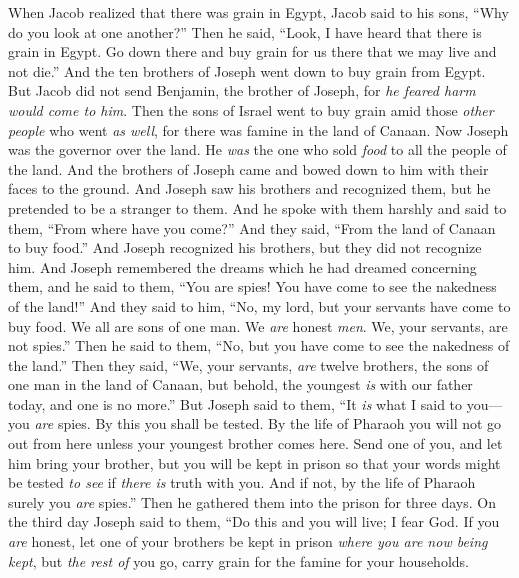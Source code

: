 \begin{biblechapter} %
 When Jacob realized that there was grain in Egypt, Jacob said to his sons, “Why do you look at one another?”
\verse Then he said, “Look, I have heard that there is grain in Egypt. Go down there and buy grain for us there that we may live and not die.”
\verse And the ten brothers of Joseph went down to buy grain from Egypt.
\verse But Jacob did not send Benjamin, the brother of Joseph, for \textit{he feared harm would come to him}.
\verse Then the sons of Israel went to buy grain amid those \textit{other people} who went \textit{as well}, for there was famine in the land of Canaan.
\verse Now Joseph was the governor over the land. He \textit{was} the one who sold \textit{food} to all the people of the land. And the brothers of Joseph came and bowed down to him with their faces to the ground.
\verse And Joseph saw his brothers and recognized them, but he pretended to be a stranger to them. And he spoke with them harshly and said to them, “From where have you come?” And they said, “From the land of Canaan to buy food.”
\verse And Joseph recognized his brothers, but they did not recognize him.
\verse And Joseph remembered the dreams which he had dreamed concerning them, and he said to them, “You are spies! You have come to see the nakedness of the land!”
\verse And they said to him, “No, my lord, but your servants have come to buy food.
\verse We all are sons of one man. We \textit{are} honest \textit{men}. We, your servants, are not spies.”
\verse Then he said to them, “No, but you have come to see the nakedness of the land.”
\verse Then they said, “We, your servants, \textit{are} twelve brothers, the sons of one man in the land of Canaan, but behold, the youngest \textit{is} with our father today, and one is no more.”
\verse But Joseph said to them, “It \textit{is} what I said to you—you \textit{are} spies.
\verse By this you shall be tested. By the life of Pharaoh you will not go out from here unless your youngest brother comes here.
\verse Send one of you, and let him bring your brother, but you will be kept in prison so that your words might be tested \textit{to see} if \textit{there is} truth with you. And if not, by the life of Pharaoh surely you \textit{are} spies.”
\verse Then he gathered them into the prison for three days.
\verse On the third day Joseph said to them, “Do this and you will live; I fear God.
\verse If you \textit{are} honest, let one of your brothers be kept in prison \textit{where you are now being kept}, but \textit{the rest of} you go, carry grain for the famine for your households.

\end{biblechapter}
